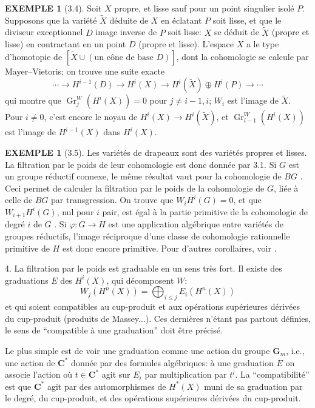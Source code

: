 \documentclass{amsart}
\theoremstyle{plain}
\theoremstyle{definition}
\newtheorem{example}[theorem]{EXEMPLE}
\theoremstyle{remark}
\DeclareMathOperator{\Gr}{Gr}
\begin{document}
\begin{example}[3.4]
Soit $X$ propre, et lisse sauf pour un point singulier isol\'e $P$. Supposons que la vari\'et\'e $\tilde{X}$ d\'eduite de $X$ en \'eclatant $P$ soit lisse, et que le diviseur exceptionnel $D$ image inverse de $P$ soit lisse: $X$ se d\'eduit de $\tilde{X}$ (propre et lisse) en contractant en un point $D$ (propre et lisse). L'espace $X$ a le type d'homotopie de $[\tilde{X} \cup (\text{un c\^one de base } D)]$, dont la cohomologie se calcule par Mayer--Vietoris; on trouve une suite exacte
\[\cdots \to H^{i-1}(D) \to H^i(X) \to H^i(\tilde{X}) \oplus H^i(P) \to \cdots\]
qui montre que $\Gr_j^W(H^i(X)) = 0$ pour $j \neq i-1, i$; $W_i$ est l'image de $\tilde{X}$. Pour $i \neq 0$, c'est encore le noyau de $H^i(X) \to H^i(\tilde{X})$, et $\Gr_{i-1}^W(H^i(X))$ est l'image de $H^{i-1}(X)$ dans $H^i(X)$.
\end{example}

\begin{example}[3.5]
Les vari\'et\'es de drapeaux sont des vari\'et\'es propres et lisses. La filtration par le poids de leur cohomologie est donc donn\'ee par 3.1. Si $G$ est un groupe r\'eductif connexe, le m\^eme r\'esultat vaut pour la cohomologie de $BG$ \cite[III]{D1}. Ceci permet de calculer la filtration par le poids de la cohomologie de $G$, li\'ee \`a celle de $BG$ par transgression. On trouve que $W_i H^i(G) = 0$, et que $W_{i+1} H^i(G)$, nul pour $i$ pair, est \'egal \`a la partie primitive de la cohomologie de degr\'e $i$ de $G$ \cite[III]{D1}. Si $\varphi: G \to H$ est une application alg\'ebrique entre vari\'et\'es de groupes r\'eductifs, l'image r\'eciproque d'une classe de cohomologie rationnelle primitive de $H$ est donc encore primitive. Pour d'autres corollaires, voir \cite[III]{D1}.
\end{example}

4. La filtration par le poids est graduable en un sens tr\`es fort. Il existe des graduations $E$ des $H^i(X)$, qui d\'ecomposent $W$:
\begin{equation}\label{eq:4.1}
W_j(H^n(X)) = \bigoplus_{i \leq j} E_i(H^n(X))
\end{equation}
et qui soient compatibles au cup-produit et aux op\'erations sup\'erieures d\'eriv\'ees du cup-produit (produits de Massey...). Ces derni\`eres n'\'etant pas partout d\'efinies, le sens de ``compatible \`a une graduation'' doit \^etre pr\'ecis\'e.

Le plus simple est de voir une graduation comme une action du groupe $\mathbf{G}_m$, i.e., une action de $\mathbf{C}^*$ donn\'ee par des formules alg\'ebriques: \`a une graduation $E$ on associe l'action o\`u $t \in \mathbf{C}^*$ agit sur $E_i$ par multiplication par $t^i$. La ``compatibilit\'e'' est que $\mathbf{C}^*$ agit par des automorphismes de $H^*(X)$ muni de sa graduation par le degr\'e, du cup-produit, et des op\'erations sup\'erieures d\'eriv\'ees du cup-produit.
\end{document}
